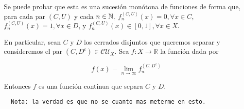 Se puede probar que esta es una sucesión monótona de funciones de forma que, para cada par $(C, U)$ y cada $n \in \mathbb{N}$, $f_n^{(C, U)}(x) =0, \forall x \in C$, $f_n^{(C, U)}(x) = 1,\forall x \in D$, y $f_n^{(C, U)}(x) \in [0, 1],\forall x \in X$.

En particular, sean $C$ y $D$ los cerrados disjuntos que queremos separar y consideremos el par $(C, D^c) \in \mathcal{CU}_X$. Sea $f : X \to \mathbb{R}$ la función dada por

$$
f(x) = \lim_{n \to \infty} f_n^{(C, D^c)}
$$

Entonces $f$ es una función continua que separa $C$ y $D$.

\begin{lstlisting}
  Nota: la verdad es que no se cuanto mas meterme en esto.
\end{lstlisting}